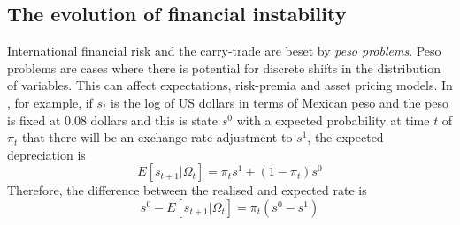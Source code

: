 \documentclass[12pt, a4paper, oneside]{article} %
\begin{document}

\subsection{The evolution of financial instability}
International financial risk and the carry-trade are beset by \emph{peso problems}. Peso problems are cases where there is  potential for discrete shifts in the distribution of variables.  This can affect expectations, risk-premia and asset pricing models. In \citet{evans199621}, for example, if $s_t$ is the log of US dollars in terms of Mexican peso and the peso is fixed at 0.08 dollars and this is state $s^0$ with a expected probability at time $t$ of $\pi_t$ that there will be an exchange rate adjustment to $s^1$, the expected depreciation is 
\begin{equation}
E[s_{t+1}|\Omega_t] = \pi_ts^1 + (1 - \pi_t)s^0
\end{equation}
Therefore, the difference between the realised and expected rate is 
\begin{equation}
s^0 - E[s_{t+1}|\Omega_t] = \pi_t(s^0 - s^1)
\end{equation}

\end{document}
